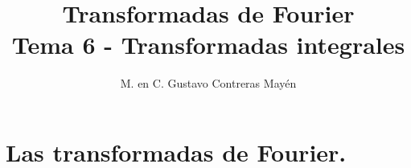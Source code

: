 
\title{Transformadas de Fourier \\ \large {Tema 6 - Transformadas integrales} \vspace{-3ex}}
\author{M. en C. Gustavo Contreras Mayén}
\date{ }

\vspace{-4cm}
\maketitle
\fontsize{14}{14}\selectfont
\tableofcontents
\newpage
\section{Las transformadas de Fourier.}

